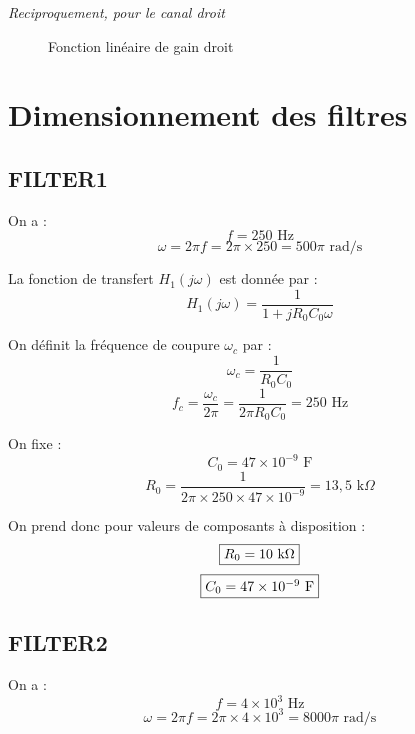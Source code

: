 \documentclass{report}
\begin{document}
\textit{Reciproquement, pour le canal droit}

\begin{figure}[h]
    \centering
    \caption{Fonction linéaire de gain droit}
    \label{fig:mixer_linear_right}
\end{figure}

\newpage

\section{Dimensionnement des filtres}

\subsection{FILTER1}
On a :
\[f = 250 \text{ Hz}
\]
\[\omega = 2\pi f = 2\pi \times 250 = 500\pi \text{ rad/s}
\]

La fonction de transfert \( H_1(j\omega) \) est donnée par :
\[H_1(j\omega) = \frac{1}{1 + j R_0 C_0 \omega}
\]

On définit la fréquence de coupure \( \omega_c \) par :
\[
\omega_c = \frac{1}{R_0 C_0}
\]
\[
f_c = \frac{\omega_c}{2\pi} = \frac{1}{2\pi R_0 C_0}=250 \text{ Hz}
\]

On fixe :
\[C_0 = 47 \times 10^{-9} \text{ F}
\]
\[R_0 = \frac{1}{2\pi \times 250 \times 47 \times 10^{-9}} = 13,5 \text{ k}\Omega
\]

On prend donc pour valeurs de composants à disposition :
\[
\fbox{$R_0 = 10 \text{ k}\Omega$}
\]
\[
\fbox{$C_0 = 47 \times 10^{-9} \text{ F}$}
\]

\newpage

\subsection{FILTER2}

On a :
\[
f = 4 \times 10^3 \text{ Hz}
\]
\[
\omega = 2\pi f = 2\pi \times 4 \times 10^3 = 8000\pi \text{ rad/s}
\]
\end{document}
